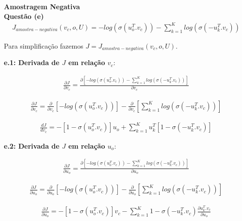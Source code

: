 \documentclass[a4paper,12pt]{article}
\begin{document}
\pagebreak

{\Large \textbf{Amostragem Negativa}}\\

{\Large \textbf{Questão (e)}}\\

\begin{align}
J_{amostra-negativa}(v_c, o, U) =  - log( \sigma(  u_o^T . v_c ) ) - \sum_{k = 1}^K log( \sigma( - u_k^T . v_c ) )
\end{align}
\noindent

Para simplificação fazemos $J = J_{amostra-negativa}(v_c, o, U)$.


\textbf{e.1: Derivada de $J$ em relação $v_c$}:

\begin{align}
\frac{\partial J}{\partial v_c} = \frac{\partial [ -log( \sigma(  u_o^T . v_c ) ) - \sum_{k = 1}^K log( \sigma( - u_k^T . v_c ) ) ]}{\partial v_c}
\end{align}

\noindent

\begin{align}
\frac{\partial J}{\partial v_c} = \frac{\partial}{\partial v_c} [ -log( \sigma(  u_o^T . v_c ) )] -\frac{\partial}{\partial v_c} [\sum_{k = 1}^K log( \sigma( - u_k^T . v_c ) ) ] 
\end{align}
\noindent


\begin{align}
\frac{dJ}{dv_c} =  - [1- \sigma(  u_o^T . v_c ) ] u_o + \sum_{k = 1}^K u_k^T [1- \sigma( -  u_k^T . v_c ) ]
\end{align}
\noindent

\textbf{e.2: Derivada de $J$ em relação $u_o$}:

\begin{align}
\frac{\partial J}{\partial u_o} = \frac{\partial [ -log( \sigma(  u_o^T . v_c ) ) - \sum_{k = 1}^K log( \sigma( - u_k^T . v_c ) ) ]}{\partial u_o}
\end{align}


\begin{align}
\frac{\partial J}{\partial u_o} = \frac{\partial}{\partial u_o} [ -log( \sigma(  u_o^T . v_c ) )] -\frac{\partial}{\partial u_o} [\sum_{k = 1}^K log( \sigma( - u_k^T . v_c ) ) ] 
\end{align}
\noindent

\begin{align}
\frac{\partial J}{\partial u_o} = - [1- \sigma(  u_o^T . v_c ) ] v_c - \sum_{k = 1}^K 1 - \sigma( - u_k^T . v_c ) \frac{\partial  u_k^T . v_c  }{\partial u_o}
\end{align}
\noindent
\end{document}
